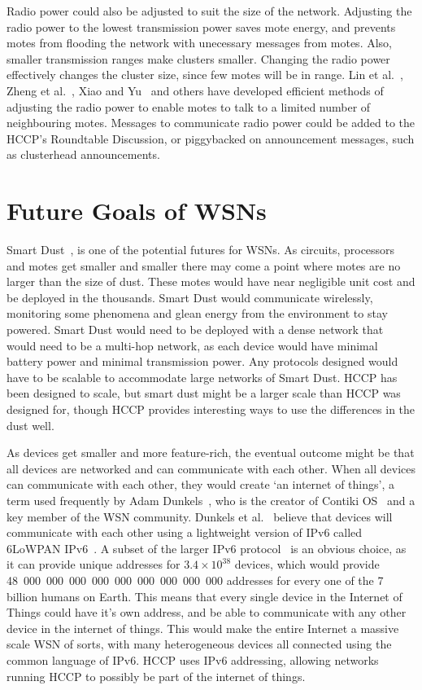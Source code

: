 Radio power could also be adjusted to suit the size of the network. Adjusting the radio power to the lowest transmission
power saves mote energy, and prevents motes from flooding the network with unecessary messages from motes. Also, smaller transmission 
ranges make clusters smaller. Changing the radio power effectively changes the cluster size, since few motes will be in 
range. 
Lin et al.~\cite{atpc}, Zheng et al.~\cite{adaptive2010}, Xiao and Yu~\cite{efficientRadioPower} and others have 
developed efficient methods of adjusting the radio power to enable motes to talk 
to a limited number of neighbouring motes. Messages to communicate radio power could be added
to the HCCP's Roundtable Discussion, or piggybacked on announcement messages, such as clusterhead announcements.


\section{Future Goals of WSNs}


Smart Dust~\cite{smartdust-2, SmartDust-NC}, is one of the potential futures for WSNs. As circuits, processors
and motes get smaller and smaller there may come a point where motes are no larger than the size of dust.
These motes would have near negligible unit cost and be deployed in the thousands. Smart
Dust would communicate wirelessly, monitoring some phenomena and glean energy from the environment
to stay powered. Smart Dust would need to be deployed with a dense network that would need to be a multi-hop 
network, as each device would have minimal battery power and minimal transmission power. Any protocols designed
would have to be scalable to accommodate large networks of Smart Dust. HCCP has been designed to scale, but 
smart dust might be a larger scale than HCCP was designed for, though HCCP provides interesting ways
to use the differences in the dust well.

As devices get smaller and more feature-rich, the eventual outcome might be
that all devices are networked and can communicate with each other. When all devices
can communicate with each other, they would create `an internet of things', a term 
used frequently by Adam Dunkels~\cite{vasseur10interconnecting}, who is the 
creator of Contiki OS~\cite{dunkels04contiki, contikiOS} and a key member of the WSN community.
Dunkels et al.~\cite{dunkels11adhoc} believe that devices will communicate with each other using a
lightweight version of IPv6 called 6LoWPAN IPv6~\cite{jhui10ipv6}. A subset of the larger IPv6 protocol~\cite{ipv6} 
is an obvious choice, as it can provide unique addresses
for $3.4 \times 10^{38}$ devices, which would provide 
48~000~000~000~000~000~000~000~000~000 addresses
for every one of the 7 billion 
humans on Earth. This means that every single device in the Internet of Things could have 
it's own address, and be able to communicate with any other device in the internet of things. 
This would make the entire Internet a massive scale WSN of sorts, with many heterogeneous 
devices all connected using the common language of IPv6. HCCP uses IPv6 addressing, allowing 
networks running HCCP to possibly be part of the internet of things.


